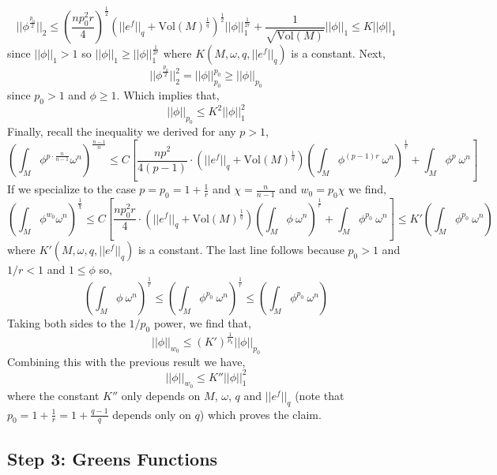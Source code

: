 \documentclass[12pt]{extarticle}
\theoremstyle{definition}
\newcommand{\Vol}[1]{\mathrm{Vol}\left(#1\right)}
\begin{document}
\[ || \phi^{\frac{p_0}{2}} ||_2 \le \left( \frac{n p_0^2 r}{4} \right)^{\frac{1}{2}} \left( || e^f ||_q + \Vol{M}^{\frac{1}{q}} \right)^{\frac{1}{2}} || \phi ||_{1}^{\frac{1}{2r}} + \frac{1}{\sqrt{\Vol{M}}} || \phi ||_1 \le K || \phi ||_1 \]
since $|| \phi ||_1 > 1$ so $|| \phi ||_1 \ge || \phi ||_1^{\frac{1}{2r}}$
where $K(M, \omega, q, || e^f ||_q)$ is a constant. 
Next,
\[ || \phi^{\frac{p_0}{2}} ||^2_2 = || \phi ||^{p_0}_{p_0} \ge || \phi ||_{p_0} \]
since $p_0 > 1$ and $\phi \ge 1$. Which implies that,
\[ || \phi ||_{p_0} \le K^2 || \phi ||_1^2 \]
Finally, recall the inequality we derived for any $p > 1$,
\[ \left( \int_M \phi^{p \cdot \frac{n}{n-1}} \omega^n \right)^{\frac{n-1}{n}} \le C \left[ \frac{n p^2}{4 (p - 1)} \cdot ( || e^f ||_q + \Vol{M}^{\frac{1}{q}}) \left( \int_M \phi^{(p - 1)r} \: \omega^n \right)^{\frac{1}{r}} + \int_M \phi^p \: \omega^n \right] \]
If we specialize to the case $p = p_0 = 1 + \frac{1}{r}$ and $\chi = \frac{n}{n-1}$ and $w_0 = p_0 \chi$ we find,
\[ \left( \int_M \phi^{w_0} \omega^n \right)^{\frac{1}{\chi}} \le C \left[ \frac{n p_0^2r}{4} \cdot ( || e^f ||_q + \Vol{M}^{\frac{1}{q}}) \left( \int_M \phi \: \omega^n \right)^{\frac{1}{r}} + \int_M \phi^{p_0} \: \omega^n \right] \le K' \left( \int_M \phi^{p_0} \: \omega^n \right) \]
where $K'(M, \omega, q, || e^f ||_q)$ is a constant. The last line follows because $p_0 > 1$ and $1/r < 1$ and $1 \le \phi$ so,
\[ \left( \int_M \phi \: \omega^n \right)^{\frac{1}{r}} \le \left( \int_M \phi^{p_0} \: \omega^n \right)^{\frac{1}{r}} \le \left( \int_M \phi^{p_0} \: \omega^n \right) \]
Taking both sides to the $1/p_0$ power, we find that,
\[ || \phi ||_{w_0} \le (K')^{\frac{1}{p_0}} || \phi ||_{p_0} \]
Combining this with the previous result we have,
\[ || \phi ||_{w_0} \le K'' || \phi ||_1^2 \]
where the constant $K''$ only depends on $M$, $\omega$, $q$ and $|| e^f ||_q$ (note that $p_0 = 1 + \frac{1}{r} = 1 + \frac{q - 1}{q}$ depends only on $q$) which proves the claim.

\subsection{Step 3: Greens Functions}
\end{document}
